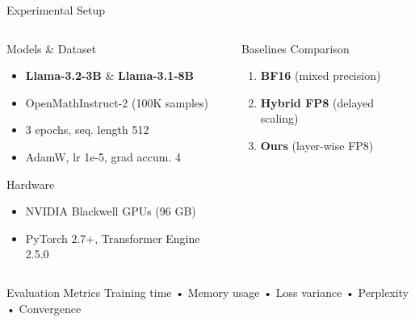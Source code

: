 \begin{frame}[squeeze]{Experimental Setup}

\begin{columns}[t]
\begin{column}{0.48\textwidth}
    \begin{block}{Models \& Dataset}
    \small
    \begin{itemize}
        \item \textbf{Llama-3.2-3B} \& \textbf{Llama-3.1-8B}
        \item OpenMathInstruct-2 (100K samples)
        \item 3 epochs, seq. length 512
        \item AdamW, lr 1e-5, grad accum. 4
    \end{itemize}
    \end{block}

    \vspace{0.15cm}

    \begin{block}{Hardware}
    \small
    \begin{itemize}
        \item NVIDIA Blackwell GPUs (96 GB)
        \item PyTorch 2.7+, Transformer Engine 2.5.0
    \end{itemize}
    \end{block}
\end{column}

\begin{column}{0.48\textwidth}
    \begin{block}{Baselines Comparison}
    \small
    \begin{enumerate}
        \item \textbf{BF16} {\footnotesize (mixed precision)}

        \item \textbf{Hybrid FP8} {\footnotesize (delayed scaling)}

        \item \textbf{Ours} {\footnotesize (layer-wise FP8)}
    \end{enumerate}
    \end{block}
\end{column}
\end{columns}

\vspace{0.2cm}

\begin{alertblock}{Evaluation Metrics}
\small
Training time • Memory usage • Loss variance • Perplexity • Convergence
\end{alertblock}

\end{frame}
